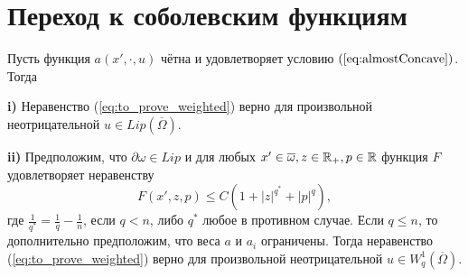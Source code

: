 \section{Переход к соболевским функциям}

\begin{thm}
\label{thm:bounded_growth}
Пусть функция $a(x', \cdot, u)$ чётна и удовлетворяет условию $(\ref{eq:almostConcave})$.
Тогда

\textbf{\textup{i)}} Неравенство (\ref{eq:to_prove_weighted}) верно для произвольной неотрицательной $u \in Lip(\overline{\Omega})$.

\textbf{\textup{ii)}} Предположим, что $\partial \omega \in Lip$ и
для любых $x' \in \overline{\omega}, z \in \Real_+, p \in \Real$
функция $F$ удовлетворяет неравенству
$$F( x', z, p ) \le C ( 1 + |z|^{q^*} + |p|^q ),$$
где $\frac{1}{q^*} = \frac{1}{q} - \frac{1}{n}$, если $q < n$, либо $q^*$ любое в противном случае.
Если $q \le n$, то дополнительно предположим, что веса $a$ и $a_i$ ограничены.
Тогда неравенство (\ref{eq:to_prove_weighted}) верно для произвольной неотрицательной $u \in W^1_q(\overline{\Omega})$.
\end{thm}

